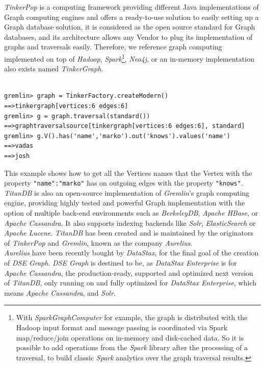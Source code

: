 \documentclass[a4paper]{report}
\newcommand{\ds}{\emph{DataStax\xspace}}
\newcommand{\ca}{\emph{Apache Cassandra\xspace}}
\newcommand{\dseg}{\emph{DSE Graph\xspace}}
\newcommand{\tp}{\emph{TinkerPop\xspace}}
\newcommand{\tdb}{\emph{TitanDB\xspace}}
\begin{document}
\tp{} is a computing framework providing different Java implementations of Graph computing engines and offers a ready-to-use solution to easily setting up a Graph database solution, it is considered as the open source standard for Graph databases, and its architecture allows any Vendor to plug its implementation of graphs and traversals easily. Therefore, we reference graph computing implemented on top of \emph{Hadoop}, \emph{Spark}\footnote{With \emph{SparkGraphComputer} for example, the graph is distributed with the Hadoop input format and message passing is coordinated via Spark map/reduce/join operations on in-memory and disk-cached data. So it is possible to add operations from the \emph{Spark} library after the processing of a traversal, to build classic \emph{Spark} analytics over the graph traversal results.}, \emph{Neo4j}, or an in-memory implementation also exists named \emph{TinkerGraph}.\\
\begin{lstlisting}[label=grml-ex-1, caption=Quick example of the syntax of Gremlin on a simple Traversal executed in the Gremlin-Console (from TinkerPop) in the Groovy language, style=Java]

gremlin> graph = TinkerFactory.createModern()
==>tinkergraph[vertices:6 edges:6]
gremlin> g = graph.traversal(standard())
==>graphtraversalsource[tinkergraph[vertices:6 edges:6], standard]
gremlin> g.V().has('name','marko').out('knows').values('name')
==>vadas
==>josh
\end{lstlisting}
This example shows how to get all the Vertices names that the Vertex with the property \verb;"name":"marko"; has on outgoing edges with the property \verb;"knows";.\\
\tdb{} is also an open-source implementation of \emph{Gremlin}'s graph computing engine, providing highly tested and powerful Graph implementation with the option of multiple back-end environments such as \emph{BerkeleyDB}, \emph{Apache HBase}, or \ca{}. It also supports indexing backends like \emph{Solr}, \emph{ElasticSearch} or \emph{Apache Lucene}. \tdb{} has been created and is maintained by the originators of \tp{} and \emph{Gremlin}, known as the company \emph{Aurelius}.\\
\emph{Aurelius} have been recently bought by \ds{}, for the final goal of the creation of \emph{DSE Graph}. \dseg{} is destined to be, as \emph{DataStax Enterprise} is for \ca{}, the production-ready, supported and optimized next version of \tdb{}, only running on and fully optimized for \emph{DataStax Enterprise}, which means \ca{}, and \emph{Solr}.
\end{document}
